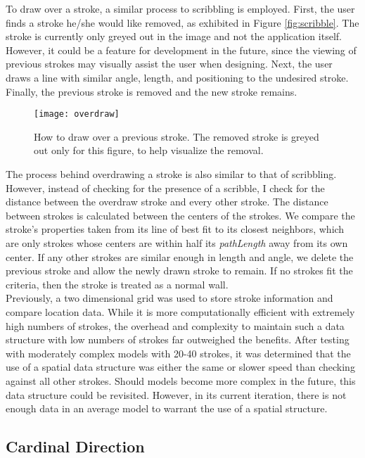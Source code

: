 To draw over a stroke, a similar process to scribbling is employed. First, the user finds a stroke he/she would like removed, as exhibited in Figure \ref{fig:scribble}. The stroke is currently only greyed out in the image and not the application itself. However, it could be a feature for development in the future, since the viewing of previous strokes may visually assist the user when designing. Next, the user draws a line with similar angle, length, and positioning to the undesired stroke. Finally, the previous stroke is removed and the new stroke remains.

\begin{figure}[ht]
\centering
\texttt{[image: overdraw]}
\caption[How to overdraw a previous stroke]{How to draw over a previous stroke. The removed stroke is greyed out only for this figure, to help visualize the removal.}
\label{fig:overdraw}
\end{figure}

The process behind overdrawing a stroke is also similar to that of scribbling. However, instead of checking for the presence of a scribble, I check for the distance between the overdraw stroke and every other stroke. The distance between strokes is calculated between the centers of the strokes. We compare the stroke's properties taken from its line of best fit to its closest neighbors, which are only strokes whose centers are within half its \textit{pathLength} away from its own center. If any other strokes are similar enough in length and angle, we delete the previous stroke and allow the newly drawn stroke to remain. If no strokes fit the criteria, then the stroke is treated as a normal wall. \\

Previously, a two dimensional grid was used to store stroke information and compare location data. While it is more computationally efficient with extremely high numbers of strokes, the overhead and complexity to maintain such a data structure with low numbers of strokes far outweighed the benefits. After testing with moderately complex models with 20-40 strokes, it was determined that the use of a spatial data structure was either the same or slower speed than checking against all other strokes. Should models become more complex in the future, this data structure could be revisited. However, in its current iteration, there is not enough data in an average model to warrant the use of a spatial structure.

\subsection{Cardinal Direction}

